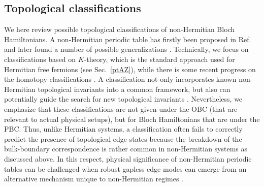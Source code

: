 \documentclass{tADP2e}
\theoremstyle{plain}
\theoremstyle{plain}
\theoremstyle{definition}
\begin{document}
\subsection{Topological classifications}\label{Sec:5topcl}
We here review possible topological classifications of non-Hermitian Bloch Hamiltonians. A non-Hermitian periodic table has firstly been proposed in Ref.~\cite{ZG18} and later found a number of possible generalizations \cite{ZH19,LCH19,KK19c,LCH19b}. Technically, we focus on  classifications based on $K$-theory, which is the standard approach used for  Hermitian free fermions (see Sec.~\ref{ptAZ}), while there is some recent progress on the homotopy classifications \cite{RK18,GJ19,ZL19,CCW19}. A  classification not only incorporates known non-Hermitian topological invariants  into a common framework, but also can potentially guide the search for new topological invariants \cite{AG192}. Nevertheless, we emphasize that these classifications are not given under the OBC (that are relevant to actual physical setups), but for Bloch Hamiltonians that are under the PBC. Thus, unlike Hermitian systems, a classification often fails to correctly predict the presence of topological edge states because the breakdown of the bulk-boundary correspondence  is rather common in non-Hermitian systems as discussed above. In this respect, physical significance of non-Hermitian periodic tables can be challenged when robust  gapless edge modes can emerge from an alternative mechanism unique to non-Hermitian regimes \cite{SK192}.   
\end{document}
